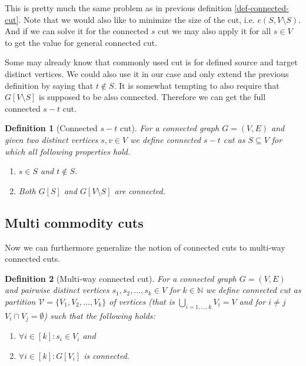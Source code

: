 \documentclass{article}
\theoremstyle{plain}
\theoremstyle{plain}
\newtheorem{defn}{Definition}
\theoremstyle{remark}
\begin{document}
	This is pretty much the same problem as in previous definition \ref{def-connected-cut}. Note that we would also like to minimize the size of the cut, i.e. $e(S, V \setminus S)$. And if we can solve it for the connected $s$ cut we may also apply it for all $s \in V$ to get the value for general connected cut.
	
	Some may already know that commonly used cut is for defined source and target distinct vertices. We could also use it in our case and only extend the previous definition by saying that $t \notin S$. It is somewhat tempting to also require that $G[V \setminus S]$ is supposed to be also connected. Therefore we can get the full connected $s-t$ cut.
	
	\begin{defn}[Connected $s-t$ cut]
		For a connected graph $G = (V,E)$ and given two distinct vertices $s, v \in V$ we define connected $s-t$ cut as $S \subseteq V$ for which all following properties hold.
		
		\begin{enumerate}
			\item $s \in S$ and $t \notin S$.
			\item Both $G[S]$ and $G[V \setminus S]$ are connected.
		\end{enumerate}
		\label{def-connected-s-t-cut}
	\end{defn}

	\subsection{Multi commodity cuts}

	Now we can furthermore generalize the notion of connected cuts to multi-way connected cuts.
	
	\begin{defn}[Multi-way connected cut]
		For a connected graph $G = (V,E)$ and pairwise distinct vertices $s_1, s_2, \dots, s_k \in V$ for $k \in \mathbb{N}$ we define connected cut as partition $\mathcal{V} = \{V_1, V_2, \dots, V_k\}$ of vertices (that is $\bigcup_{i = 1, \dots, k} V_i = V$ and for $i \neq j$ $V_i \cap V_j = \emptyset$) such that the following holds:
		
		\begin{enumerate}
			\item $\forall i \in [k]: s_i \in V_i$ and
			\item $\forall i \in [k]: G[V_i]$ is connected.
		\end{enumerate}
	\end{defn}
	
\end{document}
